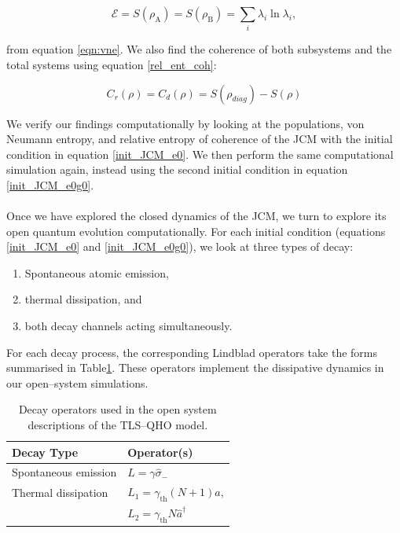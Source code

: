 \documentclass[11pt]{article}
\begin{document}
\begin{equation*}
    \mathcal{E} = S(\rho_{\scriptscriptstyle \text{A}}) = S(\rho_{\scriptscriptstyle \text{B}}) = \sum_i \lambda_i\ln\lambda_i,
\end{equation*}

from equation \eqref{eqn:vne}. We also find the coherence of both subsystems and the total systems using equation \eqref{rel_ent_coh}:

\begin{equation*} 
C_r(\rho) = C_d(\rho) = S(\rho_{diag}) - S(\rho)
\end{equation*}

We verify our findings computationally by looking at the populations, von Neumann entropy, and relative entropy of coherence of the JCM with the initial condition in equation \eqref{init_JCM_e0}. We then perform the same computational simulation again, instead using the second initial condition in equation \eqref{init_JCM_e0g0}. \\
\\
Once we have explored the closed dynamics of the JCM, we turn to explore its open quantum evolution computationally. For each initial condition (equations \eqref{init_JCM_e0} and \eqref{init_JCM_e0g0}), we look at three types of decay:

\begin{enumerate}
    \item Spontaneous atomic emission, 
    \item thermal dissipation, and
    \item both decay channels acting simultaneously.\\
\end{enumerate}

For each decay process, the corresponding Lindblad operators take the forms summarised in Table\ref{tab:decay_ops}. These operators implement the dissipative dynamics in our open--system simulations. 

\begin{table}[H]
    \centering
    \caption{Decay operators used in the open system descriptions of the TLS--QHO model.}
    \begin{tabular}{l|l}
        \toprule
        \textbf{Decay Type} & \textbf{Operator(s)} \\
        \midrule
        Spontaneous emission & $L = \gamma\hat{\sigma}_-$ \\
        Thermal dissipation & $L_1 = \gamma_{\scriptscriptstyle \text{th}}(N+1)\hat{a}$, \\
                            & $L_2 = \gamma_{\scriptscriptstyle \text{th}}N\hat{a}^\dagger$ \\
        \bottomrule
    \end{tabular}
    \label{tab:decay_ops}
\end{table}
\end{document}
